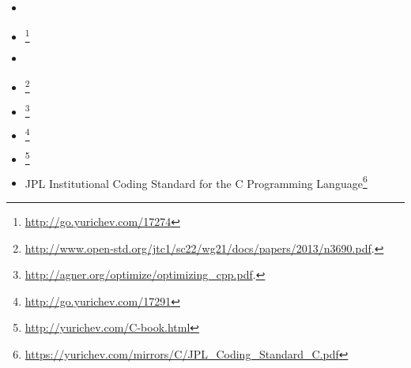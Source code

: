 \label{CCppBooks}

\begin{itemize}

\item \KRBook

\item \CNineNineStd\footnote{\AlsoAvailableAs \url{http://go.yurichev.com/17274}}

\item \TCPPPL

\item \CppOneOneStd\footnote{\AlsoAvailableAs \url{http://www.open-std.org/jtc1/sc22/wg21/docs/papers/2013/n3690.pdf}.}

\item \AgnerFogCPP\footnote{\AlsoAvailableAs \url{http://agner.org/optimize/optimizing_cpp.pdf}.}

\item \ParashiftCPPFAQ\footnote{\AlsoAvailableAs \url{http://go.yurichev.com/17291}}

\item \CNotes\footnote{\AlsoAvailableAs \url{http://yurichev.com/C-book.html}}

\item JPL Institutional Coding Standard for the C Programming Language\footnote{\AlsoAvailableAs \url{https://yurichev.com/mirrors/C/JPL_Coding_Standard_C.pdf}}

\end{itemize}

